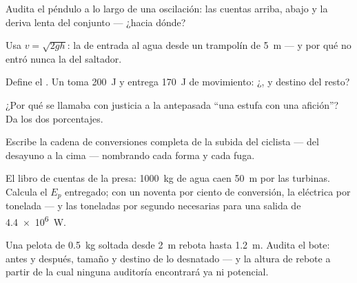 \begin{exercise}[$\star$]\label{exo:g9:energy-conversions:4}
Audita el péndulo a lo largo de una oscilación: las cuentas arriba,
abajo y la deriva lenta del conjunto --- ¿hacia dónde?
\end{exercise}

\begin{exercise}[$\star$]\label{exo:g9:energy-conversions:5}
Usa $v = \sqrt{2 g h}$: la  de entrada al agua desde un
trampolín de \qty{5}{m} --- y por qué no entró nunca la
 del saltador.
\end{exercise}

\begin{exercise}[$\star$]\label{exo:g9:energy-conversions:6}
Define el . Un  toma \qty{200}{J} y entrega
\qty{170}{J} de movimiento: ¿, y destino del resto?
\end{exercise}

\begin{exercise}[$\star$]\label{exo:g9:energy-conversions:7}
¿Por qué se llamaba con justicia a la  antepasada ``una
estufa con una afición''? Da los dos porcentajes.
\end{exercise}

\begin{exercise}[$\star$]\label{exo:g9:energy-conversions:8}
Escribe la cadena de conversiones completa de la subida del ciclista
--- del desayuno a la cima --- nombrando cada forma y cada fuga.
\end{exercise}

\begin{exercise}[$\star\star$]\label{exo:g9:energy-conversions:9}
El libro de cuentas de la presa: \qty{1000}{kg} de agua caen
\qty{50}{m} por las turbinas. Calcula el $E_p$ entregado; con un
noventa por ciento de conversión, la  eléctrica por tonelada
--- y las toneladas por segundo necesarias para una salida de
\qty{4.4e6}{W}.
\end{exercise}

\begin{exercise}[$\star\star$]\label{exo:g9:energy-conversions:10}
Una pelota de \qty{0.5}{kg} soltada desde \qty{2}{m} rebota hasta
\qty{1.2}{m}. Audita el bote:  antes y después, tamaño y
destino de lo desnatado --- y la altura de rebote a partir de la cual
ninguna auditoría encontrará ya  ni potencial.
\end{exercise}

